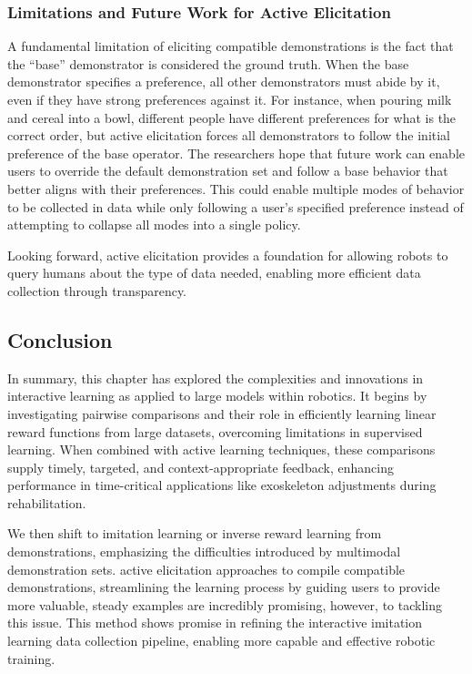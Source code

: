 \documentclass[
  letterpaper,
  numbers=noenddot,
  DIV=11]{scrreprt}
\theoremstyle{definition}
\theoremstyle{plain}
\theoremstyle{plain}
\theoremstyle{remark}
\begin{document}
\subsubsection*{Limitations and Future Work for Active
Elicitation}\label{limitations-and-future-work-for-active-elicitation}

A fundamental limitation of eliciting compatible demonstrations is the
fact that the ``base'' demonstrator is considered the ground truth. When
the base demonstrator specifies a preference, all other demonstrators
must abide by it, even if they have strong preferences against it. For
instance, when pouring milk and cereal into a bowl, different people
have different preferences for what is the correct order, but active
elicitation forces all demonstrators to follow the initial preference of
the base operator. The researchers hope that future work can enable
users to override the default demonstration set and follow a base
behavior that better aligns with their preferences. This could enable
multiple modes of behavior to be collected in data while only following
a user's specified preference instead of attempting to collapse all
modes into a single policy.

Looking forward, active elicitation provides a foundation for allowing
robots to query humans about the type of data needed, enabling more
efficient data collection through transparency.

\subsection{Conclusion}\label{conclusion-1}

In summary, this chapter has explored the complexities and innovations
in interactive learning as applied to large models within robotics. It
begins by investigating pairwise comparisons and their role in
efficiently learning linear reward functions from large datasets,
overcoming limitations in supervised learning. When combined with active
learning techniques, these comparisons supply timely, targeted, and
context-appropriate feedback, enhancing performance in time-critical
applications like exoskeleton adjustments during rehabilitation.

We then shift to imitation learning or inverse reward learning from
demonstrations, emphasizing the difficulties introduced by multimodal
demonstration sets. active elicitation approaches to compile compatible
demonstrations, streamlining the learning process by guiding users to
provide more valuable, steady examples are incredibly promising,
however, to tackling this issue. This method shows promise in refining
the interactive imitation learning data collection pipeline, enabling
more capable and effective robotic training.
\end{document}
